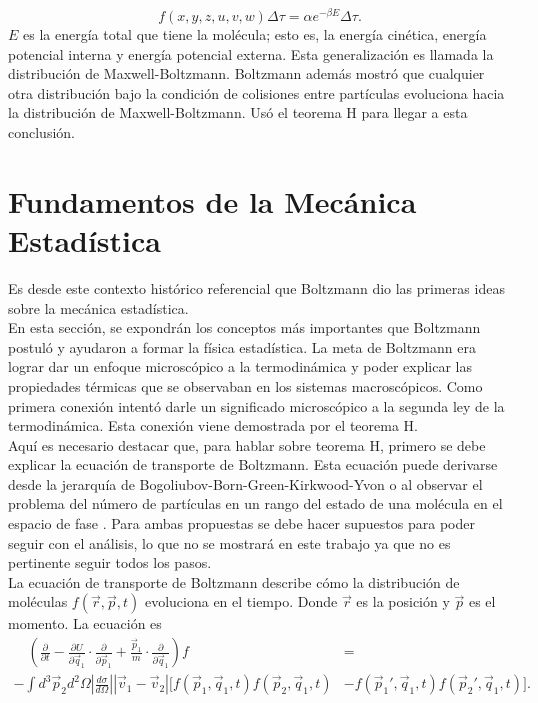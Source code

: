 \begin{equation}
f(x,y,z,u,v,w) \Delta \tau = \alpha e^{-\beta E} \Delta \tau.
\end{equation}
$E$ es la energía total que tiene la molécula; esto es, la energía cinética, energía potencial interna y energía potencial externa. Esta generalización es llamada la distribución de Maxwell-Boltzmann. Boltzmann además mostró que cualquier otra distribución bajo la condición de colisiones entre partículas evoluciona hacia la distribución de Maxwell-Boltzmann. Usó el teorema H para llegar a esta conclusión.
\section{Fundamentos de la Mecánica Estadística}
Es desde este contexto histórico referencial que Boltzmann dio las primeras ideas sobre la mecánica estadística.
\\
En esta sección, se expondrán los conceptos más importantes que Boltzmann postuló y ayudaron a formar la física estadística. La meta de Boltzmann era lograr dar un enfoque microscópico a la termodinámica y poder explicar las propiedades térmicas que se observaban en los sistemas macroscópicos. Como primera conexión intentó darle un significado microscópico a la segunda ley de la termodinámica. Esta conexión viene demostrada por el teorema H.
\\
Aquí es necesario destacar que, para hablar sobre teorema H, primero se debe explicar la ecuación de transporte de Boltzmann. Esta ecuación puede derivarse desde la jerarquía de Bogoliubov-Born-Green-Kirkwood-Yvon o al observar el problema del número de partículas en un rango del estado de una molécula en el espacio de fase \cite{HuangStat}. Para ambas propuestas se debe hacer supuestos para poder seguir con el análisis, lo que no se mostrará en este trabajo ya que no es pertinente seguir todos los pasos. 
\\
La ecuación de transporte de Boltzmann describe cómo la distribución de moléculas $f(\vec{r},\vec{p},t)$ evoluciona en el tiempo. Donde $\vec{r}$ es la posición y $\vec{p}$ es el momento. La ecuación es       	
\begin{align*}
\quad (\frac{\partial}{\partial t}- \frac{\partial U}{\partial \vec{q}_{1}} \cdot \frac{\partial}{\partial \vec{p}_{1}} +\frac{\vec{p}_{1}}{m} \cdot \frac{\partial}{\partial \vec{q}_{1}})f  &=
\\
- \int d^{3}\vec{p}_{2}d^{2} \Omega |\frac{d \sigma}{d \Omega}| |\vec{v}_{1}-\vec{v}_{2}|[f(\vec{p}_{1},\vec{q}_{1},t)f(\vec{p}_{2},\vec{q}_{1},t) &- f(\vec{p}_{1}',\vec{q}_{1},t)f(\vec{p}_{2}',\vec{q}_{1},t)].
\end{align*}
